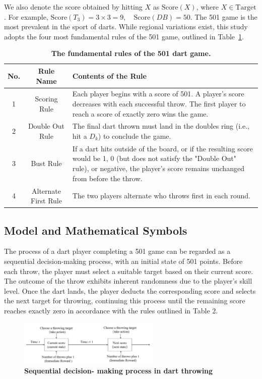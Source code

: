 \documentclass[cjjs]{ipart}
\theoremstyle{plain}
\begin{document}
We also denote the score obtained by hitting \( X \) as \( \text{Score}(X) \), where \( X \in \text{Target} \).  
For example, 
$\text{Score}(T_3) = 3 \times 3 = 9, \quad \text{Score}(DB) = 50.$
The 501 game is the most prevalent in the sport of darts. While regional variations exist, this study adopts the four most fundamental rules of the 501 game, outlined in Table~\ref{tab:rules}.
\begin{table}[h]
    \centering
    \begin{tabular}{|c|c|p{10cm}|}
        \hline
        No. & Rule Name & Contents of the Rule \\
        \hline
        1 & Scoring Rule & Each player begins with a score of 501. A player's score decreases with each successful throw. The first player to reach a score of exactly zero wins the game. \\
        \hline
        2 & Double Out Rule & The final dart thrown must land in the doubles ring (i.e., hit a \( D_k \)) to conclude the game. \\
        \hline
        3 & Bust Rule & If a dart hits outside of the board, or if the resulting score would be 1, 0 (but does not satisfy the "Double Out" rule), or negative, the player's score remains unchanged from before the throw. \\
        \hline
        4 & Alternate First Rule & The two players alternate who throws first in each round. \\
        \hline
     \end{tabular}
     \caption{\textbf{The fundamental rules of the 501 dart game.}}
     \label{tab:rules}
\end{table}


\subsection{Model and Mathematical Symbols}
The process of a dart player completing a 501 game can be regarded as a sequential decision-making process, with an initial state of 501 points. Before each throw, the player must select a suitable target based on their current score. The outcome of the throw exhibits inherent randomness due to the player's skill level. Once the dart lands, the player deducts the corresponding score and selects the next target for throwing, continuing this process until the remaining score reaches exactly zero in accordance with the rules outlined in Table 2.

\begin{figure}[h]
    \centering
    \includegraphics[width=0.60\textwidth]{2.png} 
    \caption{\textbf{Sequential decision-
making process in dart throwing}}
    \label{fig:dartboard}
\end{figure}
\end{document}
